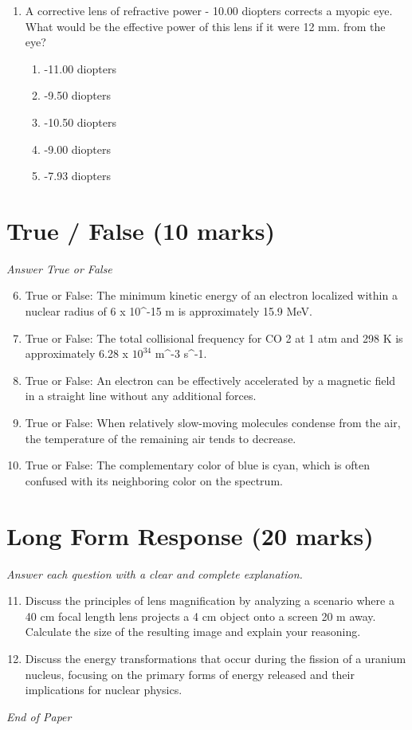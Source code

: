 \documentclass[12pt]{article}
\begin{document}
\begin{enumerate}[label=\arabic*.]
\begin{enumerate}[label=(\alph*)]
    \item slightly increases
    \item is halved
    \item becomes zero
    \item greatly decreases
\end{enumerate}
\item A corrective lens of refractive power - 10.00 diopters corrects a myopic eye. What would be the effective power of this lens if it were 12 mm. from the eye?
\begin{enumerate}[label=(\alph*)]
    \item -11.00 diopters
    \item -9.50 diopters
    \item -10.50 diopters
    \item -9.00 diopters
    \item -7.93 diopters
\end{enumerate}
\end{enumerate}

\section*{True / False (10 marks)}
\textit{Answer True or False}
\begin{enumerate}[label=\arabic*.]
\setcounter{enumi}{5}
\item True or False: The minimum kinetic energy of an electron localized within a nuclear radius of 6 x 10^-15 m is approximately 15.9 MeV.
\item True or False: The total collisional frequency for CO 2 at 1 atm and 298 K is approximately 6.28 x $10^34$ m^-3 s^-1.
\item True or False: An electron can be effectively accelerated by a magnetic field in a straight line without any additional forces.
\item True or False: When relatively slow-moving molecules condense from the air, the temperature of the remaining air tends to decrease.
\item True or False: The complementary color of blue is cyan, which is often confused with its neighboring color on the spectrum.
\end{enumerate}

\section*{Long Form Response (20 marks)}
\textit{Answer each question with a clear and complete explanation.}
\begin{enumerate}[label=\arabic*.]
\setcounter{enumi}{10}
\item Discuss the principles of lens magnification by analyzing a scenario where a 40 cm focal length lens projects a 4 cm object onto a screen 20 m away. Calculate the size of the resulting image and explain your reasoning.
\item Discuss the energy transformations that occur during the fission of a uranium nucleus, focusing on the primary forms of energy released and their implications for nuclear physics.
\end{enumerate}

\vfill
\noindent\textit{End of Paper}
\end{document}
